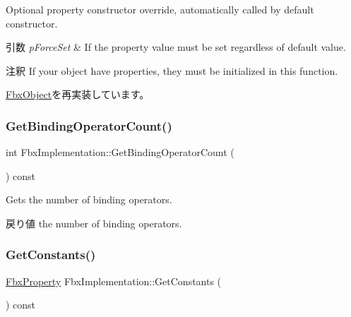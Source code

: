 Optional property constructor override, automatically called by default constructor. 
\begin{DoxyParams}{引数}
{\em p\+Force\+Set} & If the property value must be set regardless of default value. \\
\hline
\end{DoxyParams}
\begin{DoxyRemark}{注釈}
If your object have properties, they must be initialized in this function. 
\end{DoxyRemark}


\hyperlink{class_fbx_object_ad44f814323dc1b5e78bff1bfc608b4bb}{Fbx\+Object}を再実装しています。

\mbox{\label{class_fbx_implementation_aa84f7f2dc9fa201ce6e3cc230bb327e0}} 
\subsubsection{\texorpdfstring{Get\+Binding\+Operator\+Count()}{GetBindingOperatorCount()}}
{\footnotesize\ttfamily int Fbx\+Implementation\+::\+Get\+Binding\+Operator\+Count (\begin{DoxyParamCaption}{ }\end{DoxyParamCaption}) const}

Gets the number of binding operators. \begin{DoxyReturn}{戻り値}
the number of binding operators. 
\end{DoxyReturn}
\mbox{\label{class_fbx_implementation_a6b8a6fd6e27dbd2707dc8264b24ab5c9}} 
\subsubsection{\texorpdfstring{Get\+Constants()}{GetConstants()}}
{\footnotesize\ttfamily \hyperlink{class_fbx_property}{Fbx\+Property} Fbx\+Implementation\+::\+Get\+Constants (\begin{DoxyParamCaption}{ }\end{DoxyParamCaption}) const}



